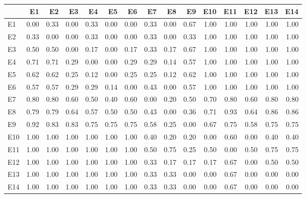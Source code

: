 
\begin{tabular}[t]{l|r|r|r|r|r|r|r|r|r|r|r|r|r|r}
\hline
  & E1 & E2 & E3 & E4 & E5 & E6 & E7 & E8 & E9 & E10 & E11 & E12 & E13 & E14\\
\hline
E1 & 0.00 & 0.33 & 0.00 & 0.33 & 0.00 & 0.00 & 0.33 & 0.00 & 0.67 & 1.00 & 1.00 & 1.00 & 1.00 & 1.00\\
\hline
E2 & 0.33 & 0.00 & 0.00 & 0.33 & 0.00 & 0.00 & 0.33 & 0.00 & 0.33 & 1.00 & 1.00 & 1.00 & 1.00 & 1.00\\
\hline
E3 & 0.50 & 0.50 & 0.00 & 0.17 & 0.00 & 0.17 & 0.33 & 0.17 & 0.67 & 1.00 & 1.00 & 1.00 & 1.00 & 1.00\\
\hline
E4 & 0.71 & 0.71 & 0.29 & 0.00 & 0.00 & 0.29 & 0.29 & 0.14 & 0.57 & 1.00 & 1.00 & 1.00 & 1.00 & 1.00\\
\hline
E5 & 0.62 & 0.62 & 0.25 & 0.12 & 0.00 & 0.25 & 0.25 & 0.12 & 0.62 & 1.00 & 1.00 & 1.00 & 1.00 & 1.00\\
\hline
E6 & 0.57 & 0.57 & 0.29 & 0.29 & 0.14 & 0.00 & 0.43 & 0.00 & 0.57 & 1.00 & 1.00 & 1.00 & 1.00 & 1.00\\
\hline
E7 & 0.80 & 0.80 & 0.60 & 0.50 & 0.40 & 0.60 & 0.00 & 0.20 & 0.50 & 0.70 & 0.80 & 0.60 & 0.80 & 0.80\\
\hline
E8 & 0.79 & 0.79 & 0.64 & 0.57 & 0.50 & 0.50 & 0.43 & 0.00 & 0.36 & 0.71 & 0.93 & 0.64 & 0.86 & 0.86\\
\hline
E9 & 0.92 & 0.83 & 0.83 & 0.75 & 0.75 & 0.75 & 0.58 & 0.25 & 0.00 & 0.67 & 0.75 & 0.58 & 0.75 & 0.75\\
\hline
E10 & 1.00 & 1.00 & 1.00 & 1.00 & 1.00 & 1.00 & 0.40 & 0.20 & 0.20 & 0.00 & 0.60 & 0.00 & 0.40 & 0.40\\
\hline
E11 & 1.00 & 1.00 & 1.00 & 1.00 & 1.00 & 1.00 & 0.50 & 0.75 & 0.25 & 0.50 & 0.00 & 0.50 & 0.75 & 0.75\\
\hline
E12 & 1.00 & 1.00 & 1.00 & 1.00 & 1.00 & 1.00 & 0.33 & 0.17 & 0.17 & 0.17 & 0.67 & 0.00 & 0.50 & 0.50\\
\hline
E13 & 1.00 & 1.00 & 1.00 & 1.00 & 1.00 & 1.00 & 0.33 & 0.33 & 0.00 & 0.00 & 0.67 & 0.00 & 0.00 & 0.00\\
\hline
E14 & 1.00 & 1.00 & 1.00 & 1.00 & 1.00 & 1.00 & 0.33 & 0.33 & 0.00 & 0.00 & 0.67 & 0.00 & 0.00 & 0.00\\
\hline
\end{tabular}
